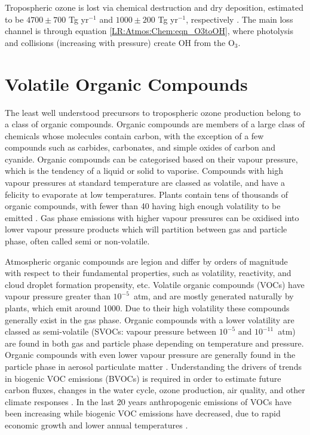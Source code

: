     Tropospheric ozone is lost via chemical destruction and dry deposition, estimated to be $4700\pm700$ Tg yr$^{-1}$ and $1000\pm200$ Tg yr$^{-1}$, respectively \parencite{Stevenson2006,Young2018}.
    The main loss channel is through equation \ref{LR:Atmos:Chem:eqn_O3toOH}, where photolysis and collisions (increasing with pressure) create OH from the O$_3$.
    

\section{Volatile Organic Compounds}
\label{LR:VOCs}

  The least well understood precursors to tropospheric ozone production belong to a class of organic compounds.
  Organic compounds are members of a large class of chemicals whose molecules contain carbon, with the exception of a few compounds such as carbides, carbonates, and simple oxides of carbon and cyanide.
  Organic compounds can be categorised based on their vapour pressure, which is the tendency of a liquid or solid to vaporise.
  Compounds with high vapour pressures at standard temperature are classed as volatile, and have a felicity to evaporate at low temperatures.
  Plants contain tens of thousands of organic compounds, with fewer than 40 having high enough volatility to be emitted \parencite{Guenther2000}.
  Gas phase emissions with higher vapour pressures can be oxidised into lower vapour pressure products which will partition between gas and particle phase, often called semi or non-volatile. 
  
  Atmospheric organic compounds are legion and differ by orders of magnitude with respect to their fundamental properties, such as volatility, reactivity, and cloud droplet formation propensity, etc.
  Volatile organic compounds (VOCs) have vapour pressure greater than $10^{-5}$~atm, and are mostly generated naturally by plants, which emit around 1000\tgpyr \parencite{Guenther1995, Glasius2016}.
  Due to their high volatility these compounds generally exist in the gas phase.
  Organic compounds with a lower volatility are classed as semi-volatile (SVOCs: vapour pressure between $10^{-5}$ and $10^{-11}$~atm) are found in both gas and particle phase depending on temperature and pressure.
  Organic compounds with even lower vapour pressure are generally found in the particle phase in aerosol particulate matter \parencite{Glasius2016}.
  Understanding the drivers of trends in biogenic VOC emissions (BVOCs) is required in order to estimate future carbon fluxes, changes in the water cycle, ozone production, air quality, and other climate responses \parencite{Yue2015}.
  In the last 20 years anthropogenic emissions of VOCs have been increasing while biogenic VOC emissions have decreased, due to rapid economic growth and lower annual temperatures \parencite{Stavrakou2014, Kwon2017}.
  
